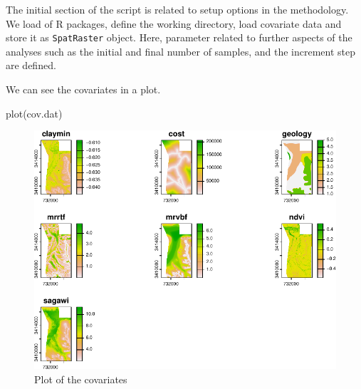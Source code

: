 \documentclass[
]{book}
\newenvironment{Shaded}{\begin{snugshade}}{\end{snugshade}}
\newcommand{\AttributeTok}[1]{\textcolor[rgb]{0.77,0.63,0.00}{#1}}
\newcommand{\CommentTok}[1]{\textcolor[rgb]{0.56,0.35,0.01}{\textit{#1}}}
\newcommand{\ConstantTok}[1]{\textcolor[rgb]{0.00,0.00,0.00}{#1}}
\newcommand{\DocumentationTok}[1]{\textcolor[rgb]{0.56,0.35,0.01}{\textbf{\textit{#1}}}}
\newcommand{\FunctionTok}[1]{\textcolor[rgb]{0.00,0.00,0.00}{#1}}
\newcommand{\NormalTok}[1]{#1}
\newcommand{\OtherTok}[1]{\textcolor[rgb]{0.56,0.35,0.01}{#1}}
\newcommand{\SpecialCharTok}[1]{\textcolor[rgb]{0.00,0.00,0.00}{#1}}
\newcommand{\StringTok}[1]{\textcolor[rgb]{0.31,0.60,0.02}{#1}}
\begin{document}
The initial section of the script is related to setup options in the methodology. We load of R packages, define the working directory, load covariate data and store it as \texttt{SpatRaster} object. Here, parameter related to further aspects of the analyses such as the initial and final number of samples, and the increment step are defined.

\begin{Shaded}
\end{Shaded}

We can see the covariates in a plot.

\begin{Shaded}
\begin{Highlighting}[]
   \FunctionTok{plot}\NormalTok{(cov.dat)}
\end{Highlighting}
\end{Shaded}

\begin{figure}
\centering
\includegraphics{Technical-Manual-Soil-Sampling-Design_files/figure-latex/fig-5-1.pdf}
\caption{\label{fig:fig-5}Plot of the covariates}
\end{figure}
\end{document}
